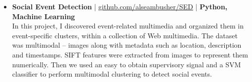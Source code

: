 \begin{itemize}


 \item \textbf{Social Event Detection} | \href{http://github.com/alseambusher/SED}{github.com/alseambusher/SED} | \textbf{Python, Machine Learning}\\
In this project, I discovered event-related multimedia and organized them in event-specific clusters, within a collection of Web multimedia. The dataset was multimodal – images along with
metadata such as location, description and timestamps. SIFT features were extracted from images to represent them numerically. Then we used an easy to obtain supervisory signal and a SVM classifier to perform multimodal clustering to detect social events.

\end{itemize}
\vspace{5pt}
